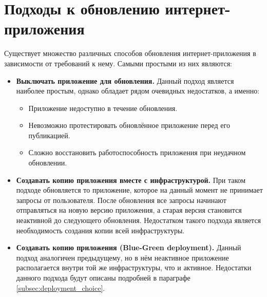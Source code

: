 \section{Подходы к обновлению интернет-приложе\-ния}
Существует множество различных способов обновления интернет-прило\-же\-ния в зависимости от требований к нему. Самыми простыми из них являются:
\begin{itemize}
	\item {\bf Выключать приложение для обновления.} Данный подход является наиболее простым, однако обладает рядом очевидных недостатков, а именно:
	\begin{itemize}
		\item Приложение недоступно в течение обновления.
		\item Невозможно протестировать обновлённое приложение перед его публикацией.
		\item Сложно восстановить работоспособность приложения при неудачном обновлении.
	\end{itemize}
	\item {\bf Создавать копию приложения вместе с инфраструктурой.} При таком подходе обновляется то приложение, которое на данный момент не принимает запросы от пользователя. После обновления все запросы начинают отправляться на новую версию приложения, а старая версия становится неактивной до следующего обновления. Недостатком такого подхода является необходимость создания копии всей инфраструктуры.
	\item {\bf Создавать копию приложения (Blue-Green deployment).} Данный подход аналогичен предыдущему, но в нём неактивное приложение располагается внутри той же инфраструктуры, что и активное. Недостатки данного подхода будут описаны подробней в параграфе \ref{subsec:deployment_choice}.
\end{itemize}
